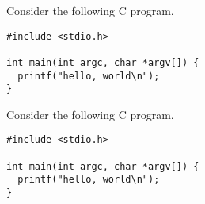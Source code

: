 \documentclass{article}
\begin{document}
\cprotEnv \begin{question}{6}
Consider the following C program.
\begin{lstlisting}
#include <stdio.h>

int main(int argc, char *argv[]) {
  printf("hello, world\n");
}
\end{lstlisting}
\end{question}

\cprotEnv \begin{solution}
Consider the following C program.
\begin{lstlisting}
#include <stdio.h>

int main(int argc, char *argv[]) {
  printf("hello, world\n");
}
\end{lstlisting}
\end{solution}

\pagebreak
\printsolutions 
\end{document}
